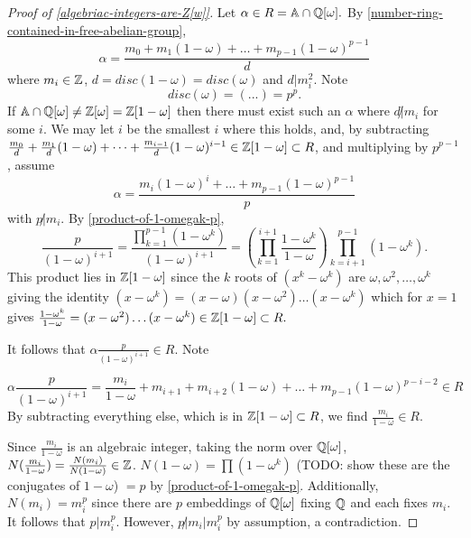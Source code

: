 \begin{proof}[Proof of \cref{algebriac-integers-are-Z[w]}]

Let $\alpha\in R=\mathbb{A}\cap\mathbb{Q}[\omega].$ By \cref{number-ring-contained-in-free-abelian-group}, 
$$\alpha=\frac{m_0+m_1(1-\omega)+\dots+m_{p-1}(1-\omega)^{p-1}}{d}$$ where $m_i\in \mathbb{Z}$, $d=disc(1-\omega)=disc(\omega)$ and $d|m_i^2$. Note $$disc(\omega)=(...)=p^p.$$ If $\mathbb{A}\cap\mathbb{Q}[\omega]\neq \mathbb{Z}[\omega]=\mathbb{Z}[1-\omega]$ then there must exist such an $\alpha$ where $d\not | m_i$ for some $i$. We may let $i$ be the smallest $i$ where this holds, and, by subtracting $\frac{m_0}{d}+\frac{m_1}{d}(1-\omega)+\dots+\frac{m_{i-1}}{d}(1-\omega)^{i-1}\in \mathbb{Z}[1-\omega]\subset R$, and multiplying by $p^{p-1}$, assume $$\alpha=\frac{m_i(1-\omega)^i+\dots+m_{p-1}(1-\omega)^{p-1}}{p}$$ with $p\not | m_i$. By \cref{product-of-1-omegak-p}, $$\frac{p}{(1-\omega)^{i+1}}=\frac{\prod_{k=1}^{p-1} (1-\omega^k)}{(1-\omega)^{i+1}}=(\prod_{k=1}^{i+1}\frac{1-\omega^k}{1-\omega})\prod_{k=i+1}^{p-1}(1-\omega^k).$$
This product lies in $\mathbb{Z}[1-\omega]$ since the $k$ roots of $(x^k-\omega^k)$ are $\omega,\omega^2,\dots,\omega^k$ giving the identity $(x-\omega^k)=(x-\omega)(x-\omega^2)\dots(x-\omega^k)$ which for $x=1$ gives $\frac{1-\omega^k}{1-\omega}=(x-\omega^2)\dots(x-\omega^k)\in \mathbb{Z}[1-\omega]\subset R.$

It follows that $\alpha \frac{p}{(1-\omega)^{i+1}}\in R.$ Note

$$\alpha \frac{p}{(1-\omega)^{i+1}}=\frac{m_i}{1-\omega}+m_{i+1}+m_{i+2}(1-\omega)+\dots+m_{p-1}(1-\omega)^{p-i-2}\in R$$
By subtracting everything else, which is in $\mathbb{Z}[1-\omega]\subset R$, we find $\frac{m_i}{1-\omega}\in R$.

Since $\frac{m_i}{1-\omega}$ is an algebraic integer, taking the norm over $\mathbb{Q}[\omega]$, $N(\frac{m_i}{1-\omega})=\frac{N(m_i)}{N(1-\omega)}\in \mathbb{Z}$. $N(1-\omega)=\prod(1-\omega^k)$ (TODO: show these are the conjugates of $1-\omega$) $=p$ by \cref{product-of-1-omegak-p}. Additionally, $N(m_i)=m_i^p$ since there are $p$ embeddings of $\mathbb{Q}[\omega]$ fixing $\mathbb{Q}$ and each fixes $m_i$. It follows that $p|m_i^p$. However, $p\not | m_i | m_i^p$ by assumption, a contradiction.


\end{proof}


